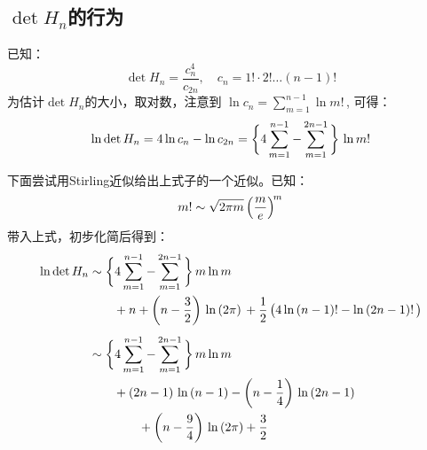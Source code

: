\documentclass[preview,10pt,border=8pt]{standalone}
\begin{document}
\subsection{$\det H_n$的行为}
	已知：
	\begin{equation}
		\det H_n = \frac{c_n^4}{c_{2n}},\quad
			c_n = 1!\cdot 2! \dots (n-1)!
	\end{equation}
	为估计$\det H_n$的大小，取对数，注意到
		$\ln c_n
			= \displaystyle\sum_{m=1}^{n-1}
				\ln m!$\,, 可得：
	\begin{equation}
		\ln\det H_n
		= 4\ln c_n - \ln c_{2n}
		= \Bqty\bigg{4\sum_{m=1}^{n-1}
			- \sum_{m=1}^{2n-1}\,}\,\ln m!
	\end{equation}
	
	下面尝试用Stirling近似给出上式子的一个近似。已知：
	\begin{equation}
		m! \sim \sqrt{2\pi m}\,
			\pqty{\frac{m}{e}}^{\!m}
	\end{equation}
	带入上式，初步化简后得到：
	\begin{equation}
	\begin{aligned}
		\ln\det H_n
		&\sim \Bqty\bigg{4\sum_{m=1}^{n-1}
			- \sum_{m=1}^{2n-1}\,}\,m\ln m \\
		&\qquad + n + \pqty{n - \frac{3}{2}}\,
			\ln\,(2\pi)\,
			+ \frac{1}{2}\,\pqty\big{
				4\ln\,(n-1)! - \ln\,(2n-1)!\,} \\[1ex]
		&\sim \Bqty\bigg{4\sum_{m=1}^{n-1}
			- \sum_{m=1}^{2n-1}\,}\,m\ln m \\
		&\qquad + (2n-1)\,\ln\,(n-1)
			- \pqty{n-\frac{1}{4}}\,\ln\,(2n-1) \\
		&\qquad\qquad
			+ \pqty{n - \frac{9}{4}}\,
				\ln\,(2\pi) + \frac{3}{2}
	\end{aligned}
	\end{equation}%
\pagebreak[3]
	
\end{document}
